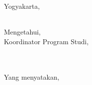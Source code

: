 \begin{flushright}
    Yogyakarta, \tglpernyataan\\
\end{flushright}
\begin{minipage}{0.4\textwidth}
    \begin{center}
        \hfill\\[2em]
        Mengetahui,\\
        Koordinator Program Studi,\\[2cm]
        \pembimbing\\
        \NIPkoorprodi
    \end{center}
\end{minipage}
\hfill
\begin{minipage}{0.47\textwidth}
    \begin{center}
        \hfill\\[2em]
        Yang menyatakan,\\[2.5cm]
        \penulis\\
        \nim
    \end{center}
\end{minipage}
